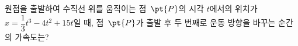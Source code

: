 원점을 출발하여 수직선 위를 움직이는 점~$\pt{P}$의 시각 $t$에서의 위치가 $x=\dfrac{1}{3}t^3-4t^2+15t$일 때, 점~$\pt{P}$가 출발 후 두 번째로 운동 방향을 바꾸는 순간의 가속도는?
